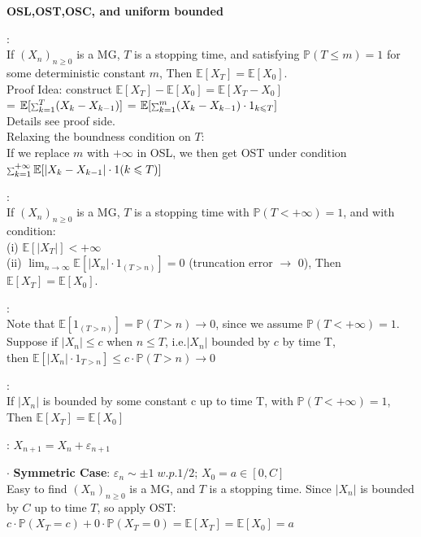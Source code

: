 \documentclass[a4paper, landscape]{article}
\newcommand{\topic}[1]{\par\medskip\textbf{#1}\par}
\newcommand{\subtopic}[1]{\par\textbf{#1}}
\newcommand{\smallsum}{\mathop{\scalebox{0.65}{$\sum$}}\nolimits}
\renewcommand{\topic}[1]{\par\medskip\noindent\colorbox{highlightcolor}{\parbox{\dimexpr\columnwidth-2\fboxsep\relax}{\textbf{#1}}}\par}
\renewcommand{\subtopic}[1]{\par\textbf{\color{blue}{#1}}} %
\begin{document}
\begin{multicols}{4}
\topic{OSL,OST,OSC, and uniform bounded}
\subtopic{Optional Stopping Lemma(OSL)}:\\
If $(X_n)_{n\geq0}$ is a MG, $T$ is a stopping time, and satisfying $\mathbb P(T\leqslant m)=1$ for some deterministic constant $m$, Then $\mathbb E[X_T]=\mathbb E[X_0]$.\vspace{0.5em}\\
Proof Idea: construct $\mathbb E[X_T]-\mathbb E[X_0]=\mathbb E[X_T-X_0]$ \\ 
= $\mathbb E[\smallsum_{k=1}^T(X_k-X_{k-1})]$
= $\mathbb E[\smallsum_{k=1}^m(X_k-X_{k-1})\cdot 1_{k\leqslant T}]$\\
Details see proof side.\vspace{0.5em}\\
Relaxing the boundness condition on $T$:\\
If we replace $m$ with $+\infty$ in OSL, we then get OST under condition $\smallsum_{k=1}^{+\infty} \mathbb E[|X_k-X_{k-1}|\cdot 1(k\leqslant T)]$\\
\subtopic{Optional Stopping Theorem(OST)}:\\
If $(X_n)_{n\geq0}$ is a MG, $T$ is a stopping time with $\mathbb P(T<+\infty)=1$, and with condition:\\
(i) $\mathbb E[|X_T|]<+\infty$\\
 (ii) $\lim_{n\to\infty} \mathbb E[|X_n|\cdot1_{(T>n)}]=0$ (truncation error $\to$ 0), Then $\mathbb E[X_T]=\mathbb E[X_0]$.\vspace{0.5em}
\subtopic{A useful Corollary}:\\
Note that $\mathbb E[1_{(T>n)}]=\mathbb P(T>n)\to 0$, since we assume $\mathbb P(T<+\infty)=1$. Suppose if $|X_n|\leqslant c$ when $n \leqslant T$, i.e.$|X_n|$ bounded by $c$ by time T,\\ then $\mathbb E[|X_n|\cdot1_{T>n} ]\leqslant c\cdot\mathbb P(T>n)\to 0$
\subtopic{Corollary (OSC)}:\\
If $|X_n|$ is bounded by some constant c up to time T, with $\mathbb P(T<+\infty)=1$, Then $\mathbb E[X_T]=\mathbb E[X_0]$\vspace{0.5em}
\subtopic{Application on Gambler's ruin}: $X_{n+1}=X_n+\varepsilon_{n+1}$
\par $\cdot$ \textbf{Symmetric Case}: $\varepsilon_n \sim \pm1\;w.p. 1/2$; $X_0=a\in [0,C]$\\
Easy to find $(X_n)_{n\geq0}$ is a MG, and $T$ is a stopping time. Since $|X_n|$ is bounded by $C$ up to time $T$, so apply OST:\\
$c\cdot\mathbb P(X_T=c)+0\cdot\mathbb P(X_T=0)=\mathbb E[X_T]=\mathbb E[X_0]=a$\\

\end{multicols}
\end{document}
